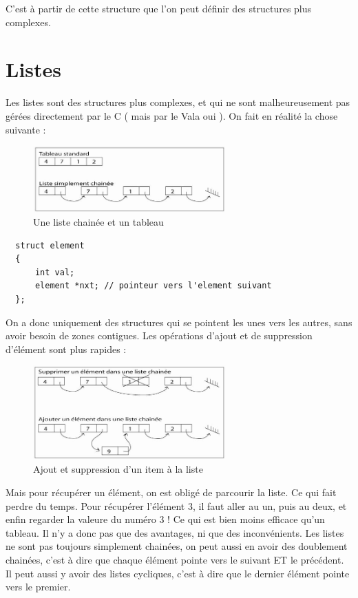 C'est à partir de cette structure que l'on peut définir des structures plus complexes.

\section{Listes}
\label{DefListe}
Les listes sont des structures plus complexes, et qui ne sont malheureusement pas gérées directement par le C ( mais par le Vala oui ).
On fait en réalité la chose suivante : 
\begin{figure}[H]
	\begin{center}
	  \includegraphics[width=20em]{Annexes/Images/liste.jpg}
	\end{center}
	\caption{Une liste chainée et un tableau}
\end{figure}
\begin{lstlisting}
  struct element
  {
      int val;
      element *nxt; // pointeur vers l'element suivant
  };
\end{lstlisting}

On a donc uniquement des structures qui se pointent les unes vers les autres, sans avoir besoin de zones contigues. Les opérations d'ajout et de suppression d'élément sont plus rapides : 
\begin{figure}[H]
	\begin{center}
	  \includegraphics[width=20em]{Annexes/Images/liste_ajout.jpg}
	\end{center}
	\caption{Ajout et suppression d'un item à la liste}
\end{figure}

Mais pour récupérer un élément, on est obligé de parcourir la liste. Ce qui fait perdre du temps. Pour récupérer l'élément 3, il faut aller au un, puis au deux, et enfin regarder la valeure du numéro 3 !
Ce qui est bien moins efficace qu'un tableau. Il n'y a donc pas que des avantages, ni que des inconvénients. Les listes ne sont pas toujours simplement chainées, on peut aussi en avoir des doublement chainées, c'est à dire que chaque élément pointe vers le suivant ET le précédent. Il peut aussi y avoir des listes cycliques, c'est à dire que le dernier élément pointe vers le premier.
